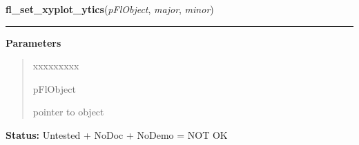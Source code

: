     \label{xformslib:flxyplot:fl_set_xyplot_ytics}

    \vspace{0.5ex}

\hspace{.8\funcindent}\begin{boxedminipage}{\funcwidth}

    \raggedright \textbf{fl\_set\_xyplot\_ytics}(\textit{pFlObject}, \textit{major}, \textit{minor})

    \vspace{-1.5ex}

    \rule{\textwidth}{0.5\fboxrule}
\setlength{\parskip}{2ex}
\setlength{\parskip}{1ex}
      \textbf{Parameters}
      \vspace{-1ex}

      \begin{quote}
        \begin{Ventry}{xxxxxxxxx}

          \item[pFlObject]

          pointer to object

        \end{Ventry}

      \end{quote}

\textbf{Status:} Untested + NoDoc + NoDemo = NOT OK



    \end{boxedminipage}

    \label{xformslib:flxyplot:fl_set_xyplot_xbounds}

    \vspace{0.5ex}

